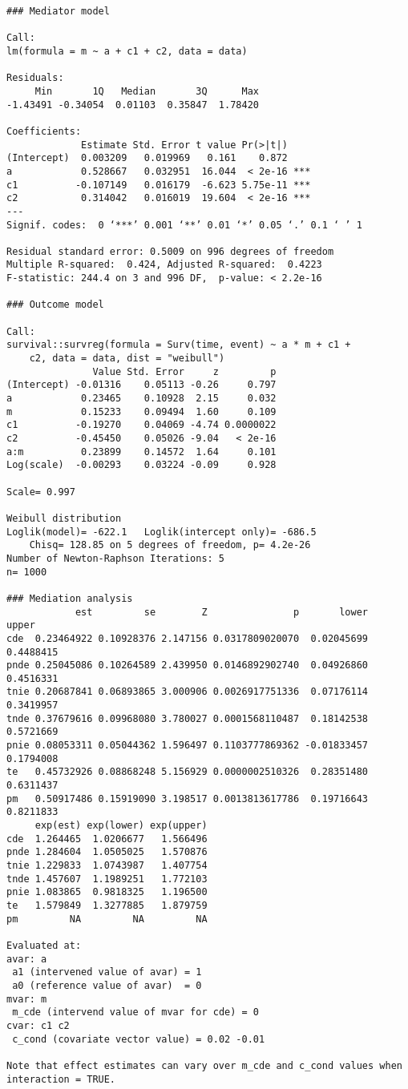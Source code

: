 \documentclass[dvipdfmx,10pt]{article}
\begin{document}
\begin{verbatim}
### Mediator model

Call:
lm(formula = m ~ a + c1 + c2, data = data)

Residuals:
     Min       1Q   Median       3Q      Max 
-1.43491 -0.34054  0.01103  0.35847  1.78420 

Coefficients:
             Estimate Std. Error t value Pr(>|t|)    
(Intercept)  0.003209   0.019969   0.161    0.872    
a            0.528667   0.032951  16.044  < 2e-16 ***
c1          -0.107149   0.016179  -6.623 5.75e-11 ***
c2           0.314042   0.016019  19.604  < 2e-16 ***
---
Signif. codes:  0 ‘***’ 0.001 ‘**’ 0.01 ‘*’ 0.05 ‘.’ 0.1 ‘ ’ 1

Residual standard error: 0.5009 on 996 degrees of freedom
Multiple R-squared:  0.424,	Adjusted R-squared:  0.4223 
F-statistic: 244.4 on 3 and 996 DF,  p-value: < 2.2e-16

### Outcome model

Call:
survival::survreg(formula = Surv(time, event) ~ a * m + c1 + 
    c2, data = data, dist = "weibull")
               Value Std. Error     z         p
(Intercept) -0.01316    0.05113 -0.26     0.797
a            0.23465    0.10928  2.15     0.032
m            0.15233    0.09494  1.60     0.109
c1          -0.19270    0.04069 -4.74 0.0000022
c2          -0.45450    0.05026 -9.04   < 2e-16
a:m          0.23899    0.14572  1.64     0.101
Log(scale)  -0.00293    0.03224 -0.09     0.928

Scale= 0.997 

Weibull distribution
Loglik(model)= -622.1   Loglik(intercept only)= -686.5
	Chisq= 128.85 on 5 degrees of freedom, p= 4.2e-26 
Number of Newton-Raphson Iterations: 5 
n= 1000 

### Mediation analysis 
            est         se        Z               p       lower     upper
cde  0.23464922 0.10928376 2.147156 0.0317809020070  0.02045699 0.4488415
pnde 0.25045086 0.10264589 2.439950 0.0146892902740  0.04926860 0.4516331
tnie 0.20687841 0.06893865 3.000906 0.0026917751336  0.07176114 0.3419957
tnde 0.37679616 0.09968080 3.780027 0.0001568110487  0.18142538 0.5721669
pnie 0.08053311 0.05044362 1.596497 0.1103777869362 -0.01833457 0.1794008
te   0.45732926 0.08868248 5.156929 0.0000002510326  0.28351480 0.6311437
pm   0.50917486 0.15919090 3.198517 0.0013813617786  0.19716643 0.8211833
     exp(est) exp(lower) exp(upper)
cde  1.264465  1.0206677   1.566496
pnde 1.284604  1.0505025   1.570876
tnie 1.229833  1.0743987   1.407754
tnde 1.457607  1.1989251   1.772103
pnie 1.083865  0.9818325   1.196500
te   1.579849  1.3277885   1.879759
pm         NA         NA         NA

Evaluated at:
avar: a
 a1 (intervened value of avar) = 1
 a0 (reference value of avar)  = 0
mvar: m
 m_cde (intervend value of mvar for cde) = 0
cvar: c1 c2
 c_cond (covariate vector value) = 0.02 -0.01

Note that effect estimates can vary over m_cde and c_cond values when interaction = TRUE.
\end{verbatim}
\end{document}
